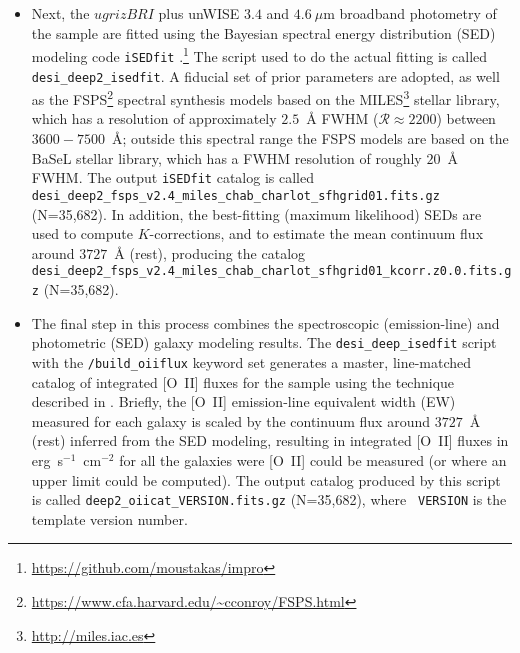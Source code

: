 \documentclass[12pt]{article}
\newcommand{\oii}{[O~II]}
\begin{document}
\begin{itemize}
\item{Next, the $ugrizBRI$ plus unWISE $3.4$ and $4.6~\mu$m broadband
  photometry of the sample are fitted using the Bayesian spectral
  energy distribution (SED) modeling code {\tt iSEDfit}
  \citep{moustakas13a}.\footnote{\url{https://github.com/moustakas/impro}}
  The script used to do the actual fitting is called {\tt
    desi\_deep2\_isedfit}.  A fiducial set of prior parameters are
  adopted, as well as the
  FSPS\footnote{\url{https://www.cfa.harvard.edu/~cconroy/FSPS.html}}
  \citep[v2.4;][]{conroy09a, conroy10b} spectral synthesis models
  based on the MILES\footnote{\url{http://miles.iac.es}} stellar
  library, which has a resolution of approximately $2.5$~\AA{} FWHM
  ($\mathcal{R}\approx2200$) between $3600-7500$~\AA; outside this
  spectral range the FSPS models are based on the BaSeL stellar
  library, which has a FWHM resolution of roughly $20$~\AA{} FWHM.
  The output {\tt iSEDfit} catalog is called {\tt
    desi\_deep2\_fsps\_v2.4\_miles\_chab\_charlot\_sfhgrid01.fits.gz}
  (N=35,682).  In addition, the best-fitting (maximum likelihood) SEDs
  are used to compute $K$-corrections, and to estimate the mean
  continuum flux around $3727$~\AA{} (rest), producing the catalog
  {\tt
    desi\_deep2\_fsps\_v2.4\_miles\_chab\_charlot\_sfhgrid01\_kcorr.z0.0.fits.gz}
  (N=35,682).}

\item{The final step in this process combines the spectroscopic
  (emission-line) and photometric (SED) galaxy modeling results.  The
  {\tt desi\_deep\_isedfit} script with the {\tt /build\_oiiflux}
  keyword set generates a master, line-matched catalog of integrated
  \oii{} fluxes for the sample using the technique described in
  \citet{zhu09a}.  Briefly, the \oii{} emission-line equivalent width
  (EW) measured for each galaxy is scaled by the continuum flux around
  $3727$~\AA{} (rest) inferred from the SED modeling, resulting in
  integrated \oii{} fluxes in erg~s$^{-1}$~cm$^{-2}$ for all the
  galaxies were \oii{} could be measured (or where an upper limit
  could be computed).  The output catalog produced by this script is
  called {\tt deep2\_oiicat\_VERSION.fits.gz} (N=35,682), where {\tt
    VERSION} is the template version number.}
\end{itemize}

\end{document}
